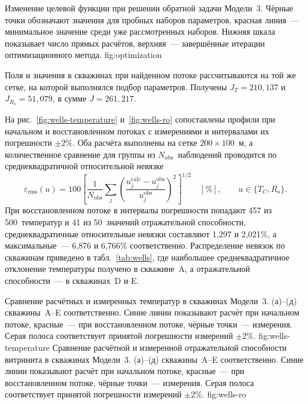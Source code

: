  {Изменение целевой функции при решении обратной задачи Модели~3. Чёрные точки обозначают значения для пробных наборов параметров, красная линия~--- минимальное значение среди уже рассмотренных наборов. Нижняя шкала показывает число прямых расчётов, верхняя~--- завершённые итерации оптимизационного метода.} {fig:optimization}

Поля и значения в скважинах при найденном потоке рассчитываются на той же сетке, на которой выполнялся подбор параметров. Получены $J_T=210{,}137$ и $J_{R_o}=51{,}079$, в сумме $J=261{,}217$.

На рис.~\ref{fig:wells-temperature} и~\ref{fig:wells-ro} сопоставлены профили при начальном и восстановленном потоках с измерениями и интервалами их погрешности $\pm2\%$. Оба расчёта выполнены на сетке $200\times100$~м, а количественное сравнение для группы из $N_{\mathrm{obs}}$~наблюдений проводится по среднеквадратичной относительной невязке
\begin{equation}
 \varepsilon_{\mathrm{rms}}(u) = 100\left[
 \frac{1}{N_{\mathrm{obs}}}\sum_j
 \left(\frac{u_j^{\mathrm{calc}} - u_j^{\mathrm{obs}}}
 {u_j^{\mathrm{obs}}}\right)^2\right]^{1/2}\quad[\%],
 \qquad u \in \{T_C,R_o\}.
 \label{eq:rms-residual}
\end{equation}
При восстановленном потоке в интервалы погрешности попадают 457 из 500~температур и 41 из 50~значений отражательной способности, среднеквадратичные относительные невязки составляют 1,297 и 2,021\%, а максимальные~--- 6,876 и 6,766\% соответственно. Распределение невязок по скважинам приведено в табл.~\ref{tab:wells}, где наибольшее среднеквадратичное отклонение температуры получено в скважине~A, а отражательной способности~--- в скважинах~D и E.

 {Сравнение расчётных и измеренных температур в скважинах Модели~3. (а)--(д) скважины~A--E соответственно. Синие линии показывают расчёт при начальном потоке, красные~--- при восстановленном потоке, чёрные точки~--- измерения. Серая полоса соответствует принятой погрешности измерений $\pm2\%$.} {fig:wells-temperature}
 {Сравнение расчётной и измеренной отражательной способности витринита в скважинах Модели~3. (а)--(д) скважины~A--E соответственно. Синие линии показывают расчёт при начальном потоке, красные~--- при восстановленном потоке, чёрные точки~--- измерения. Серая полоса соответствует принятой погрешности измерений $\pm2\%$.} {fig:wells-ro}


